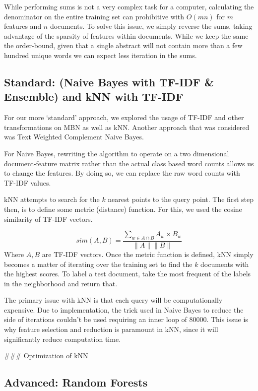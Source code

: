 \documentclass[10pt,twocolumn]{article}
\begin{document}
While performing sums is not a very complex task for a computer, calculating the denominator on the entire training set can prohibitive with $O(mn)$ for $m$ features and $n$ documents. To solve this issue, we simply reverse the sums, taking advantage of the sparsity of features within documents. While we keep the same the order-bound, given that a single abstract will not contain more than a few hundred unique words we can expect less iteration in the sums.

\subsection*{Standard: (Naive Bayes with TF-IDF \& Ensemble) and kNN with TF-IDF}

For our more `standard' approach, we explored the usage of TF-IDF and other transformations on MBN as well as kNN. Another approach that was considered was Text Weighted Complement Naive Bayes.

For Naive Bayes, rewriting the algorithm to operate on a two dimensional document-feature matrix rather than the actual class based word counts allows us to change the features. By doing so, we can replace the raw word counts with TF-IDF values. 

kNN attempts to search for the $k$ nearest points to the query point. The first step then, is to define some metric (distance) function. For this, we used the cosine similarity of TF-IDF vectors.

\[
sim(A,B) = \frac {\sum_{w \in A \cap B} A_w \times B_w} {\| A \| \| B \|}
\]
Where $A,B$ are TF-IDF vectors. Once the metric function is defined, kNN simply becomes a matter of iterating over the training set to find the $k$ documents with the highest scores. To label a test document, take the most frequent of the labels in the neighborhood and return that. 

The primary issue with kNN is that each query will be computationally expensive. Due to implementation, the trick used in Naive Bayes to reduce the side of iterations couldn't be used requiring an inner loop of 80000. This issue is why feature selection and reduction is paramount in kNN, since it will significantly reduce computation time.

\#\#\# Optimization of kNN

\subsection*{Advanced: Random Forests}
\end{document}
